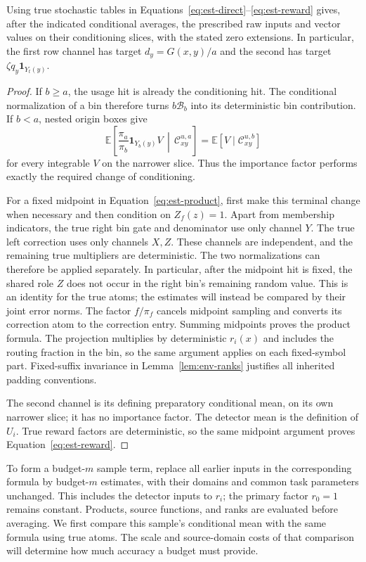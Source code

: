 \begin{lemma}\label{lem:est-true-means}
Using true stochastic tables in
Equations~\eqref{eq:est-direct}--\eqref{eq:est-reward} gives, after the
indicated conditional averages, the prescribed raw inputs and vector
values on their conditioning slices, with the stated zero extensions.
In particular, the first row channel has target
$d_y=G(x,y)/a$ and the second has target $\zeta q_y\mathbf1_{Y_t(y)}$.
\end{lemma}
\begin{proof}
If $b\ge a$, the usage hit is already the conditioning hit.  The
conditional normalization of a bin therefore turns $b\mathcal B_b$ into
its deterministic bin contribution.  If $b<a$, nested origin boxes give
\[
 \mathbb E\left[\frac{\pi_a}{\pi_b}\mathbf1_{Y_b(y)}V
                   \,\middle|\,\mathcal C_{xy}^{u,a}\right]
   =\mathbb E[V\mid\mathcal C_{xy}^{u,b}]
\]
for every integrable $V$ on the narrower slice.  Thus the importance factor
performs exactly the required change of conditioning.

For a fixed midpoint in Equation~\eqref{eq:est-product}, first make this
terminal change when necessary and then condition on $Z_f(z)=1$.
Apart from membership indicators, the true right bin gate and denominator
use only channel $Y$.  The true left correction uses only channels $X,Z$.
These channels are independent, and the remaining true multipliers are
deterministic.  The two normalizations can therefore be applied separately.
In particular, after the midpoint hit is fixed, the shared role $Z$
does not occur in the right bin's remaining random value.  This is an
identity for the true atoms; the estimates will instead be compared by
their joint error norms.
The factor $f/\pi_f$ cancels midpoint sampling and converts its correction
atom to the correction entry.  Summing midpoints proves the product
formula.  The projection multiplies by deterministic $r_i(x)$ and includes
the routing fraction in the bin, so the same argument applies on each
fixed-symbol part.  Fixed-suffix invariance in Lemma~\ref{lem:env-ranks}
justifies all inherited padding conventions.

The second channel is its defining preparatory conditional mean, on its
own narrower slice; it has no importance factor.  The detector mean is
the definition of $U_i$.  True reward factors are deterministic, so the
same midpoint argument proves Equation~\eqref{eq:est-reward}.
\end{proof}

To form a budget-$m$ sample term, replace all earlier inputs in the
corresponding formula by budget-$m$ estimates, with their domains and
common task parameters unchanged.  This includes the detector inputs
to $r_i$; the primary factor $r_0=1$ remains constant.  Products, source
functions, and ranks are evaluated before averaging.  We first compare
this sample's conditional mean with the same formula using true atoms.
The scale and source-domain costs of that comparison will determine
how much accuracy a budget must provide.

